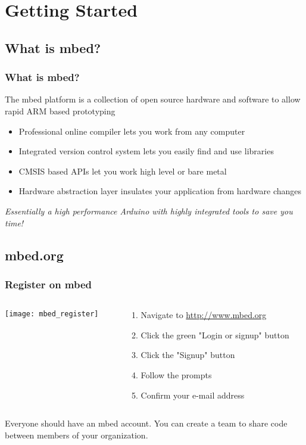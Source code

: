 \section{Getting Started}
\label{sec:getting_started}

\subsection{What is mbed?}
\label{sub:what_is_mbed}
\begin{frame}
	\frametitle{What is mbed?}
	The mbed platform is a collection of open source hardware and software to allow rapid ARM based prototyping
	\begin{itemize}
		\item Professional online compiler lets you work from any computer
		\item Integrated version control system lets you easily find and use libraries
		\item CMSIS based APIs let you work high level or bare metal
		\item Hardware abstraction layer insulates your application from hardware changes
	\end{itemize}
	\textit{Essentially a high performance Arduino with highly integrated tools to save you time!}
\end{frame}

\subsection{mbed.org}
\label{sub:mbed_org}
\begin{frame}
	\frametitle{Register on mbed}
	\begin{columns}[c]
		\begin{column}{0.5\textwidth}
			\texttt{[image: mbed\_register]}
		\end{column}
		\begin{column}{0.5\textwidth}
			\begin{enumerate}
				\item Navigate to \url{http://www.mbed.org}
				\item Click the green "Login or signup" button
				\item Click the "Signup" button
				\item Follow the prompts
				\item Confirm your e-mail address
			\end{enumerate}
		\end{column}
	\end{columns}
	\begin{center}
		Everyone should have an mbed account.
		You can create a team to share code between members of your organization.
	\end{center}
\end{frame}

